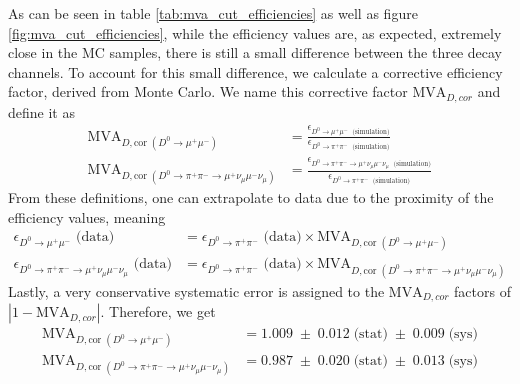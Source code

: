 As can be seen in table \ref{tab:mva_cut_efficiencies} as well as figure \ref{fig:mva_cut_efficiencies}, while the efficiency values are, as expected, extremely close in the MC samples, there is still a small difference between the three decay channels. To account for this small difference, we calculate a corrective efficiency factor, derived from Monte Carlo. We name this corrective factor $\text{MVA}_{D, cor}$ and define it as
\begin{equation}
    \begin{split}
    \text{MVA}_{D,\text{cor}\;(D^0 \to \mu^+ \mu^-)} &= 
    \frac{\epsilon_{D^0 \to \mu^+ \mu^-\; \text{ (simulation)}}}
         {\epsilon_{D^0 \to \pi^+ \pi^-\; \text{ (simulation)}}} \\
    \text{MVA}_{D,\text{cor}\;(D^0 \to \pi^+ \pi^- \to \mu^+ \nu_\mu \mu^- \nu_\mu)} &= 
    \frac{\epsilon_{D^0 \to \pi^+ \pi^- \to \mu^+ \nu_\mu \mu^- \nu_\mu\; \text{ (simulation)}}}
         {\epsilon_{D^0 \to \pi^+ \pi^-\; \text{ (simulation)}}}
    \end{split}
\end{equation}
From these definitions, one can extrapolate to data due to the proximity of the efficiency values, meaning
\begin{equation}
    \begin{split}
    \epsilon_{D^0 \to \mu^+ \mu^-} \text{ (data)} &= 
    \epsilon_{D^0 \to \pi^+ \pi^-} \text{ (data)} 
    \times \text{MVA}_{D,\text{cor}\;(D^0 \to \mu^+ \mu^-)} \\
    \epsilon_{D^0 \to \pi^+ \pi^- \to \mu^+ \nu_\mu \mu^- \nu_\mu} \text{ (data)} &= 
    \epsilon_{D^0 \to \pi^+ \pi^-} \text{ (data)} 
    \times \text{MVA}_{D,\text{cor}\;(D^0 \to \pi^+ \pi^- \to \mu^+ \nu_\mu \mu^- \nu_\mu)}
    \end{split}
\end{equation}
Lastly, a very conservative systematic error is assigned to the $\text{MVA}_{D, cor}$ factors of $|1-\text{MVA}_{D, cor}|$. Therefore, we get
\begin{equation}
\begin{split}
    \text{MVA}_{D,\text{cor}\;(D^0 \to \mu^+ \mu^-)} &= 1.009\;\pm\;0.012 \; \text{(stat)}\;\pm\;0.009 \; \text{(sys)} \\
    \text{MVA}_{D,\text{cor}\;(D^0 \to \pi^+ \pi^- \to \mu^+ \nu_\mu \mu^- \nu_\mu)} &= 0.987\;\pm\;0.020 \; \text{(stat)}\;\pm\;0.013 \; \text{(sys)}
\end{split}
\end{equation}
    
